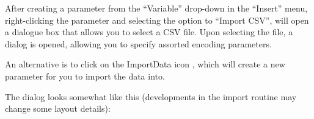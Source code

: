 \label{CSV import} \label{Operation:csvImport}

After creating a parameter from the ``Variable'' drop-down in the
``Insert'' menu, right-clicking the parameter and selecting the
option to ``Import CSV'', will open a dialogue box that allows you
to select a CSV file. Upon selecting the file, a dialog is opened,
allowing you to specify assorted encoding parameters.

An alternative is to click on the ImportData icon ,
which will create a new parameter for you to import the data into.

The dialog looks somewhat like this (developments in the import routine
may change some layout details):
\begin{center}
\par\end{center}


